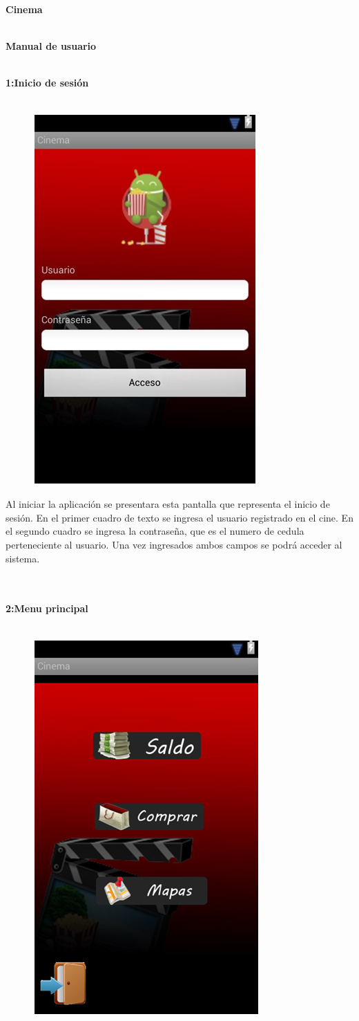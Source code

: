 \documentclass[20pt]{article}
\begin{document}
\begin{center}
\begin{huge}
\textbf{Cinema}\\\
\end{huge}
\end{center}

\begin{center}
\begin{huge}
\textbf{Manual de usuario}\\\
\end{huge}
\end{center}


\begin{large}
\textbf{1:Inicio de sesión}\\\
\end{large}

\begin{figure}[h]
\begin{center}
\includegraphics[width=100 pt]{./inicio.jpg}
\end{center}
\end{figure}

Al iniciar la aplicación se presentara esta pantalla que representa el inicio de sesión. En el primer cuadro de texto se ingresa el usuario registrado en el cine. En el segundo cuadro se ingresa la contraseña, que es el numero de cedula perteneciente al usuario. Una vez ingresados ambos campos se podrá acceder al sistema.\\\\\



\begin{large}
\textbf{2:Menu principal}\\\
\end{large}

\begin{figure}[h]
\begin{center}
\includegraphics[width=100 pt]{./menu_principal.jpg}
\end{center}
\end{figure}
\end{document}
